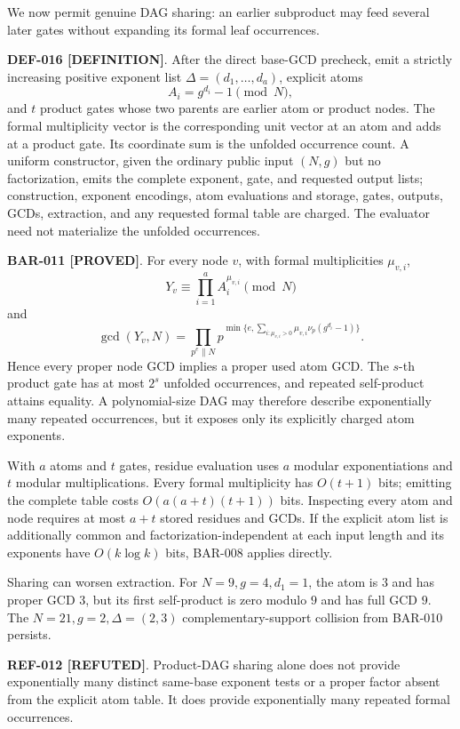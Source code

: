 \documentclass[11pt]{article}
\newcommand{\claimstatus}[2]{\textbf{#1 [#2]}}
\begin{document}
We now permit genuine DAG sharing: an earlier subproduct may feed several
later gates without expanding its formal leaf occurrences.

\claimstatus{DEF-016}{DEFINITION}. After the direct base-GCD precheck, emit a
strictly increasing positive exponent list
\(\Delta=(d_1,\ldots,d_a)\), explicit atoms
\[
A_i=g^{d_i}-1\pmod N,
\]
and \(t\) product gates whose two parents are earlier atom or product nodes.
The formal multiplicity vector is the corresponding unit vector at an atom
and adds at a product gate. Its coordinate sum is the unfolded occurrence
count. A uniform constructor, given the ordinary public input \((N,g)\) but
no factorization, emits the complete exponent, gate, and requested output
lists; construction, exponent encodings, atom evaluations and storage,
gates, outputs, GCDs, extraction, and any requested formal table are charged.
The evaluator need not materialize the unfolded occurrences.

\claimstatus{BAR-011}{PROVED}. For every node \(v\), with formal
multiplicities \(\mu_{v,i}\),
\[
Y_v\equiv\prod_{i=1}^a A_i^{\mu_{v,i}}\pmod N
\]
and
\[
\gcd(Y_v,N)=
\prod_{p^e\parallel N}
p^{\min\{e,\sum_{i:\mu_{v,i}>0}
\mu_{v,i}\nu_p(g^{d_i}-1)\}}.
\]
Hence every proper node GCD implies a proper used atom GCD. The \(s\)-th
product gate has at most \(2^s\) unfolded occurrences, and repeated
self-product attains equality. A polynomial-size DAG may therefore describe
exponentially many repeated occurrences, but it exposes only its explicitly
charged atom exponents.

With \(a\) atoms and \(t\) gates, residue evaluation uses \(a\) modular
exponentiations and \(t\) modular multiplications. Every formal
multiplicity has \(O(t+1)\) bits; emitting the complete table costs
\(O(a(a+t)(t+1))\) bits. Inspecting every atom and node requires at most
\(a+t\) stored residues and GCDs. If the explicit atom list is additionally
common and factorization-independent at each input length and its exponents
have \(O(k\log k)\) bits, BAR-008 applies directly.

Sharing can worsen extraction. For \(N=9,g=4,d_1=1\), the atom is \(3\) and
has proper GCD \(3\), but its first self-product is zero modulo \(9\) and has
full GCD \(9\). The \(N=21,g=2,\Delta=(2,3)\) complementary-support
collision from BAR-010 persists.

\claimstatus{REF-012}{REFUTED}. Product-DAG sharing alone does not provide
exponentially many distinct same-base exponent tests or a proper factor
absent from the explicit atom table. It does provide exponentially many
repeated formal occurrences.
\end{document}
